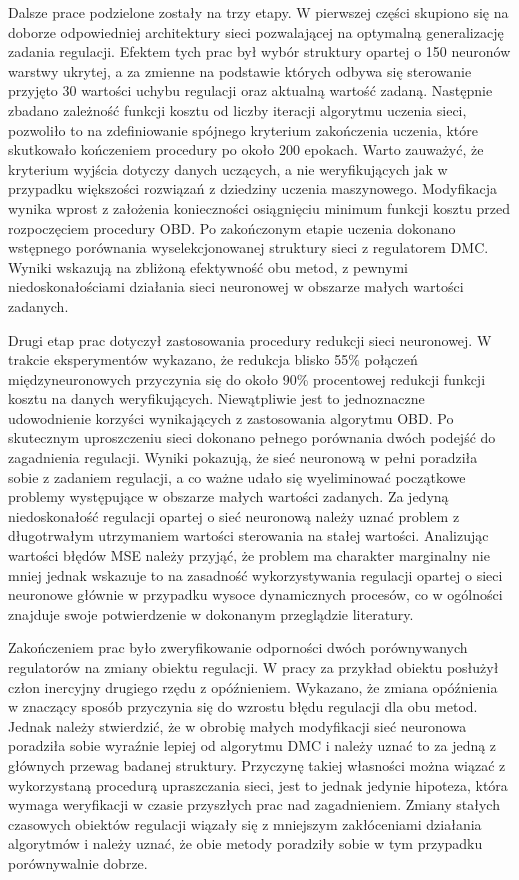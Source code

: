 \par Dalsze prace podzielone zostały na trzy etapy. W pierwszej części skupiono się na doborze odpowiedniej architektury sieci pozwalającej na optymalną generalizację zadania regulacji. Efektem tych prac był wybór struktury opartej o 150 neuronów warstwy ukrytej, a za zmienne na podstawie których odbywa się sterowanie przyjęto 30 wartości uchybu regulacji oraz aktualną wartość zadaną. Następnie zbadano zależność funkcji kosztu od liczby iteracji algorytmu uczenia sieci, pozwoliło to na zdefiniowanie spójnego kryterium zakończenia uczenia, które skutkowało kończeniem procedury po około 200 epokach. Warto zauważyć, że kryterium wyjścia dotyczy danych uczących, a nie weryfikujących jak w przypadku większości rozwiązań z dziedziny uczenia maszynowego. Modyfikacja wynika wprost z założenia konieczności osiągnięciu minimum funkcji kosztu przed rozpoczęciem procedury OBD. Po zakończonym etapie uczenia dokonano wstępnego porównania wyselekcjonowanej struktury sieci z regulatorem DMC. Wyniki wskazują na zbliżoną efektywność obu metod, z pewnymi niedoskonałościami działania sieci neuronowej w obszarze małych wartości zadanych.
\par Drugi etap prac dotyczył zastosowania procedury redukcji sieci neuronowej. W trakcie eksperymentów wykazano, że redukcja blisko 55\% połączeń międzyneuronowych przyczynia się do około 90\% procentowej redukcji funkcji kosztu na danych weryfikujących. Niewątpliwie jest to jednoznaczne udowodnienie korzyści wynikających z zastosowania algorytmu OBD. Po skutecznym uproszczeniu sieci dokonano pełnego porównania dwóch podejść do zagadnienia regulacji. Wyniki pokazują, że sieć neuronową w pełni poradziła sobie z zadaniem regulacji, a co ważne udało się wyeliminować początkowe problemy występujące w obszarze małych wartości zadanych. Za jedyną niedoskonałość regulacji opartej o sieć neuronową należy uznać problem z długotrwałym utrzymaniem wartości sterowania na stałej wartości. Analizując wartości błędów MSE należy przyjąć, że problem ma charakter marginalny nie mniej jednak wskazuje to na zasadność wykorzystywania regulacji opartej o sieci neuronowe głównie w przypadku wysoce dynamicznych procesów, co w ogólności znajduje swoje potwierdzenie w dokonanym przeglądzie literatury.
\par Zakończeniem prac było zweryfikowanie odporności dwóch porównywanych regulatorów na zmiany obiektu regulacji. W pracy za przykład obiektu posłużył człon inercyjny drugiego rzędu z opóźnieniem. Wykazano, że zmiana opóźnienia w znaczący sposób przyczynia się do wzrostu błędu regulacji dla obu metod. Jednak należy stwierdzić, że w obrobię małych modyfikacji sieć neuronowa poradziła sobie wyraźnie lepiej od algorytmu DMC i należy uznać to za jedną z głównych przewag badanej struktury. Przyczynę takiej własności można wiązać z wykorzystaną procedurą upraszczania sieci, jest to jednak jedynie hipoteza, która wymaga weryfikacji w czasie przyszłych prac nad zagadnieniem. Zmiany stałych czasowych obiektów regulacji wiązały się z mniejszym zakłóceniami działania algorytmów i należy uznać, że obie metody poradziły sobie w tym przypadku porównywalnie dobrze.
